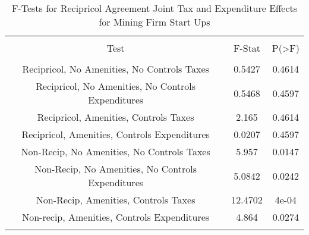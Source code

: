 
\begin{table}[!htbp] \centering 
  \caption{F-Tests for Recipricol Agreement Joint Tax and Expenditure Effects for Mining Firm Start Ups} 
  \label{21Ftests} 
\begin{tabular}{@{\extracolsep{5pt}} ccc} 
\\[-1.8ex]\hline 
\hline \\[-1.8ex] 
Test & F-Stat & P(\textgreater F) \\ 
\hline \\[-1.8ex] 
Recipricol, No Amenities, No Controls Taxes & 0.5427 & 0.4614 \\ 
Recipricol, No Amenities, No Controls Expenditures & 0.5468 & 0.4597 \\ 
Recipricol, Amenities, Controls Taxes & 2.165 & 0.4614 \\ 
Recipricol, Amenities, Controls Expenditures & 0.0207 & 0.4597 \\ 
Non-Recip, No Amenities, No Controls Taxes & 5.957 & 0.0147 \\ 
Non-Recip, No Amenities, No Controls Expenditures & 5.0842 & 0.0242 \\ 
Non-Recip, Amenities, Controls Taxes & 12.4702 & 4e-04 \\ 
Non-recip, Amenities, Controls Expenditures & 4.864 & 0.0274 \\ 
\hline \\[-1.8ex] 
\end{tabular} 
\end{table} 
